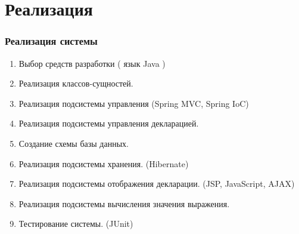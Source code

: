 \documentclass[xcolor=pdftex, dvipsnames, table]{beamer}
\begin{document}
\section{Реализация}
\begin{frame}
  \frametitle{Реализация системы}
  \begin{enumerate}
    \item Выбор средств разработки ( язык Java )
    \item Реализация классов-сущностей.
    \item Реализация подсистемы управления (Spring MVC, Spring IoC)
    \item Реализация подсистемы управления декларацией.
    \item Создание схемы базы данных.
    \item Реализация подсистемы хранения. (Hibernate)
    \item Реализация подсистемы отображения декларации. (JSP, JavaScript, AJAX)
    \item Реализация подсистемы вычисления значения выражения.
    \item Тестирование системы. (JUnit)
  \end{enumerate}
\end{frame}
\end{document}

